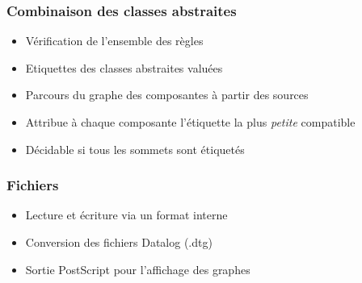 \begin{frame}
	\frametitle{Combinaison des classes abstraites}
	\begin{itemize}
		\item Vérification de l'ensemble des règles
		\item Etiquettes des classes abstraites valuées
		\item Parcours du graphe des composantes à partir des sources
		\item Attribue à chaque composante l'étiquette la plus {\em petite} compatible
		\item Décidable si tous les sommets sont étiquetés
	\end{itemize}
\end{frame}

\begin{frame}
	\frametitle{Fichiers}
	\begin{itemize}
		\item Lecture et écriture via un format interne
		\item Conversion des fichiers Datalog (.dtg)
		\item Sortie PostScript pour l'affichage des graphes
	\end{itemize}
\end{frame}

